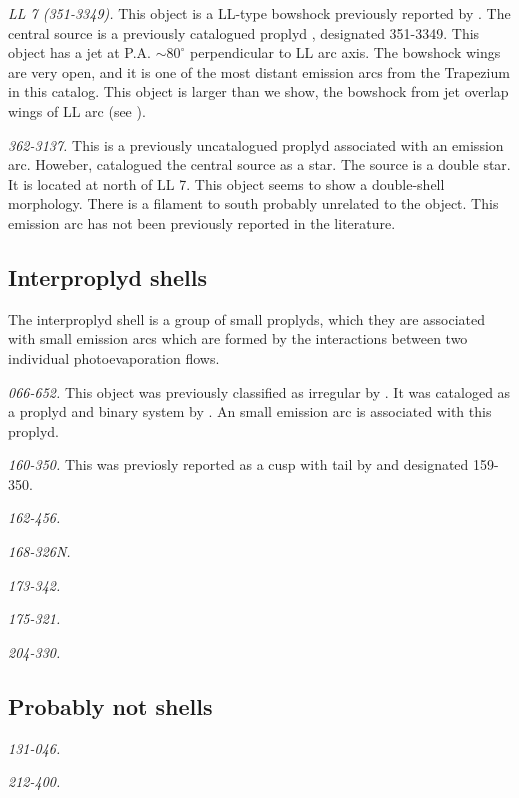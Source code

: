 \documentclass{article}
\begin{document}
\textit{LL 7 (351-3349).} This object is a LL-type bowshock previously reported by \citet{Bally:2001}. The central source is a previously catalogued proplyd \citep{Ricci:2008}, designated 351-3349. This object has a jet at P.A. $\sim 80^{\circ}$ perpendicular to LL arc axis. The  bowshock  wings are very open, and it is one of the most distant emission arcs from the Trapezium in this catalog. This object is larger than we show, the bowshock from jet overlap wings of LL arc (see \citealp{Bally:2001}).   

\textit{362-3137.} This is a previously uncatalogued proplyd associated with an emission arc. Howeber, \citet{Rio:2009} catalogued the central source as a star. The source is a double star. It is located at north of LL 7. This object seems to show a double-shell morphology. There is a filament to south probably unrelated to the object. This emission arc has not been previously reported in the literature. 


\subsection{Interproplyd shells}
\label{sec:inter}

The interproplyd shell is a  group of small proplyds, which they are associated with small emission arcs which are formed by the interactions between two individual photoevaporation flows.

\textit{066-652.} This object was previously classified as irregular by \citet{Odell:1996}. It  was  cataloged as a proplyd and binary system by \citet{Ricci:2008}. An small emission arc is associated with this proplyd. 
    
\textit{160-350.} This was previosly reported as a cusp with tail by \citet{Odell:1996} and designated 159-350. 

\textit{162-456.}

\textit{168-326N.}

\textit{173-342.}

\textit{175-321.}

\textit{204-330.}

\subsection{Probably not shells}
\label{sec:notshell}

\textit{131-046.} 

\textit{212-400.}



\end{document}
